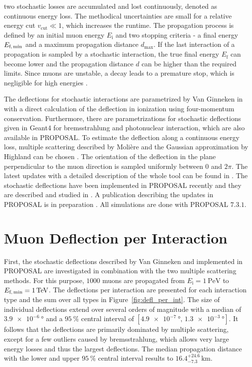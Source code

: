 \documentclass[pdflatex, sn-mathphys]{sn-jnl}%
\theoremstyle{thmstyleone}%
\theoremstyle{thmstyletwo}%
\theoremstyle{thmstylethree}%
\begin{document}
two stochastic losses are accumulated and lost continuously, denoted 
as continuous energy loss.
The methodical uncertainties are small 
for a relative energy cut $v_{\mathrm{cut}}\ll 1$, which increases the runtime.
The 
propagation process is defined by an initial muon energy $E_{\text{i}}$ and 
two stopping criteria - a final energy $E_{\text{f,\,min}}$ and a 
maximum propagation distance $d_{\text{max}}$. If the last interaction of 
a propagation is sampled by a stochastic interaction, the true final energy 
$E_{\text{f}}$ can become lower and the 
propagation distance $d$ can be higher than the required limits. 
Since muons are unstable, a decay leads to a premature 
stop, which is negligible for high energies \cite{phd_soedingrekso}.

The deflections for stochastic interactions are parametrized by Van Ginneken 
in \cite{Van_Ginneken} with a direct calculation of the deflection in 
ionization using four-momentum conservation. 
Furthermore, there are parametrizations for stochastic deflections given in Geant4 \cite{GEANT4} 
for bremsstrahlung and photonuclear interaction, which 
are also available in PROPOSAL.
To estimate the deflection along 
a continuous energy loss, multiple scattering described by Molière 
\cite{moliere_scattering} and the Gaussian approximation by Highland 
can be chosen \cite{HIGHLAND_1975}. 
The orientation of the deflection in the plane perpendicular to the muon direction is 
sampled uniformly between $0$ and $2\pi$.
The latest updates with a detailed description of the whole tool can be found 
in \cite{phd_soedingrekso}. 
The stochastic deflections have been implemented in PROPOSAL recently and they are 
described and studied in \cite{Gutjahr_2021}.
A publication describing the 
updates in PROPOSAL is in preparation \cite{Alameddine_2022}.
All simulations are done with PROPOSAL $7.3.1$.

\section{Muon Deflection per Interaction}\label{sec:defl_per_int}
First, the stochastic deflections described by Van Ginneken \cite{Van_Ginneken} 
and implemented 
in PROPOSAL are investigated in combination with the two multiple scattering methods. 
For this purpose, $\num{1000}$ muons are propagated from $E_{\text{i}} = \SI{1}{\peta\electronvolt}$ to $E_{\text{f,\,min}} = \SI{1}{\tera\electronvolt}$.
The deflections per interaction are presented 
for each interaction type and the sum over all types in Figure~\ref{fig:defl_per_int}. 
The size of individual deflections 
extend over several orders of magnitude with a median of $\SI{3.9e-6}{\degree}$
and a $\SI{95}{\percent}$ central interval of $[\SI{4.9e-7}{\degree}, \,\SI{1.3e-3}{\degree}]$. 
It follows that the deflections are primarily dominated by multiple scattering, except for a few outliers caused by bremsstrahlung, which 
allows very large energy losses and thus the largest deflections.
The median propagation distance with the lower and upper $\SI{95}{\percent}$ 
central interval results to $16.4_{-7.3}^{+24.6}\,\si{\kilo\meter}$.
\end{document}
